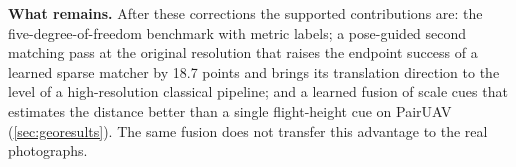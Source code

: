 \documentclass[10pt,twocolumn,letterpaper]{article}
\begin{document}
\noindent\textbf{What remains.} After these corrections the supported contributions are: the five-degree-of-freedom benchmark with metric labels; a pose-guided second matching pass at the original resolution that raises the endpoint success of a learned sparse matcher by 18.7 points and brings its translation direction to the level of a high-resolution classical pipeline; and a learned fusion of scale cues that estimates the distance better than a single flight-height cue on PairUAV (\cref{sec:georesults}). The same fusion does not transfer this advantage to the real photographs.

{
    \small
    
    
}
\end{document}
